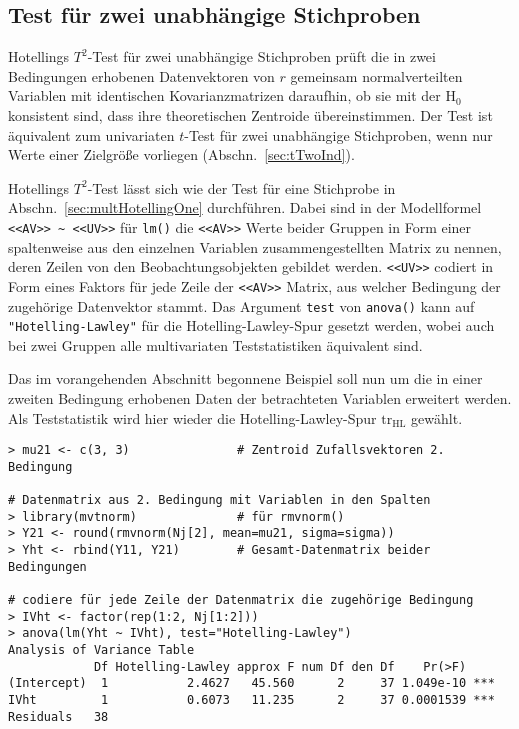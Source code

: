 \subsection{Test für zwei unabhängige Stichproben}
\label{sec:multHotellingTwoInd}

Hotellings $T^{2}$-Test für zwei unabhängige Stichproben prüft die in zwei Bedingungen erhobenen Datenvektoren von $r$ gemeinsam normalverteilten Variablen mit identischen Kovarianzmatrizen daraufhin, ob sie mit der $\text{H}_{0}$ konsistent sind, dass ihre theoretischen Zentroide übereinstimmen. Der Test ist äquivalent zum univariaten $t$-Test für zwei unabhängige Stichproben, wenn nur Werte einer Zielgröße vorliegen (Abschn.\ \ref{sec:tTwoInd}).

Hotellings $T^{2}$-Test lässt sich wie der Test für eine Stichprobe in Abschn.\ \ref{sec:multHotellingOne} durchführen. Dabei sind in der Modellformel \lstinline!<<AV>> ~ <<UV>>! für \lstinline!lm()! die \lstinline!<<AV>>! Werte beider Gruppen in Form einer spaltenweise aus den einzelnen Variablen zusammengestellten Matrix zu nennen, deren Zeilen von den Beobachtungsobjekten gebildet werden. \lstinline!<<UV>>! codiert in Form eines Faktors für jede Zeile der \lstinline!<<AV>>! Matrix, aus welcher Bedingung der zugehörige Datenvektor stammt. Das Argument \lstinline!test! von \lstinline!anova()! kann auf \lstinline!"Hotelling-Lawley"! für die Hotelling-Lawley-Spur gesetzt werden, wobei auch bei zwei Gruppen alle multivariaten Teststatistiken äquivalent sind.

Das im vorangehenden Abschnitt begonnene Beispiel soll nun um die in einer zweiten Bedingung erhobenen Daten der betrachteten Variablen erweitert werden. Als Teststatistik wird hier wieder die Hotelling-Lawley-Spur $\text{tr}_{\text{HL}}$ gewählt.
\begin{lstlisting}
> mu21 <- c(3, 3)               # Zentroid Zufallsvektoren 2. Bedingung

# Datenmatrix aus 2. Bedingung mit Variablen in den Spalten
> library(mvtnorm)              # für rmvnorm()
> Y21 <- round(rmvnorm(Nj[2], mean=mu21, sigma=sigma))
> Yht <- rbind(Y11, Y21)        # Gesamt-Datenmatrix beider Bedingungen

# codiere für jede Zeile der Datenmatrix die zugehörige Bedingung
> IVht <- factor(rep(1:2, Nj[1:2]))
> anova(lm(Yht ~ IVht), test="Hotelling-Lawley")
Analysis of Variance Table
            Df Hotelling-Lawley approx F num Df den Df    Pr(>F)
(Intercept)  1           2.4627   45.560      2     37 1.049e-10 ***
IVht         1           0.6073   11.235      2     37 0.0001539 ***
Residuals   38
\end{lstlisting}

